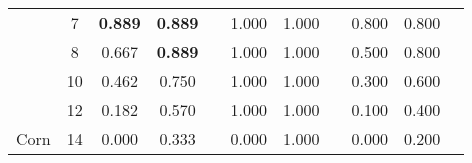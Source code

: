 \begin{table}[]
\begin{tabular}{|c|c|c|c|c|c|c|c|c|c|c|}
                        & 7                     & \cellcolor[HTML]{EFEFEF}\textbf{0.889} & \cellcolor[HTML]{EFEFEF}\textbf{0.889} & \cellcolor[HTML]{EFEFEF}               & 1.000    & 1.000    &          & \cellcolor[HTML]{EFEFEF}0.800 & \cellcolor[HTML]{EFEFEF}0.800 & \cellcolor[HTML]{EFEFEF}      \\ \cline{2-11} 
                        & 8                     & \cellcolor[HTML]{EFEFEF}0.667          & \cellcolor[HTML]{EFEFEF}\textbf{0.889} & \cellcolor[HTML]{EFEFEF}               & 1.000    & 1.000    &          & \cellcolor[HTML]{EFEFEF}0.500 & \cellcolor[HTML]{EFEFEF}0.800 & \cellcolor[HTML]{EFEFEF}      \\ \cline{2-11} 
                        & 10                    & \cellcolor[HTML]{EFEFEF}0.462          & \cellcolor[HTML]{EFEFEF}0.750          & \cellcolor[HTML]{EFEFEF}               & 1.000    & 1.000    &          & \cellcolor[HTML]{EFEFEF}0.300 & \cellcolor[HTML]{EFEFEF}0.600 & \cellcolor[HTML]{EFEFEF}      \\ \cline{2-11} 
                        & 12                    & \cellcolor[HTML]{EFEFEF}0.182          & \cellcolor[HTML]{EFEFEF}0.570          & \cellcolor[HTML]{EFEFEF}               & 1.000    & 1.000    &          & \cellcolor[HTML]{EFEFEF}0.100 & \cellcolor[HTML]{EFEFEF}0.400 & \cellcolor[HTML]{EFEFEF}      \\ \cline{2-11} 
\multirow{-9}{*}{Corn}  & 14                    & \cellcolor[HTML]{EFEFEF}0.000          & \cellcolor[HTML]{EFEFEF}0.333          & \cellcolor[HTML]{EFEFEF}               & 0.000    & 1.000    &          & \cellcolor[HTML]{EFEFEF}0.000 & \cellcolor[HTML]{EFEFEF}0.200 & \cellcolor[HTML]{EFEFEF}      \\ \hline
\end{tabular}
\end{table}
